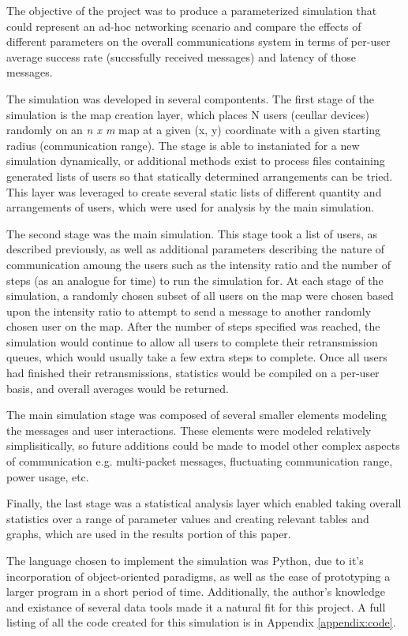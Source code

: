 The objective of the project was to produce a parameterized simulation 
that could represent an ad-hoc networking scenario and compare the effects 
of different parameters on the overall communications system in terms of 
per-user average success rate (succssfully received messages) 
and latency of those messages.

The simulation was developed in several compontents.
The first stage of the simulation is the map creation layer,
which places N users (ceullar devices) randomly on an \textit{n x m} map at a
given (x, y) coordinate with a given starting radius (communication range).
The stage is able to instaniated for a new simulation dynamically, or additional
methods exist to process files containing generated lists of users so that
statically determined arrangements can be tried.
This layer was leveraged to create several static lists of different quantity
and arrangements of users, which were used for analysis by the main simulation.

The second stage was the main simulation.
This stage took a list of users, as described previously, as well as additional
parameters describing the nature of communication amoung the users such as
the intensity ratio and the number of steps (as an analogue for time) to run 
the simulation for.
At each stage of the simulation, a randomly chosen subset of all users on the map
were chosen based upon the intensity ratio to attempt to send a message to another
randomly chosen user on the map.
After the number of steps specified was reached, the simulation would continue
to allow all users to complete their retransmission queues, which would usually
take a few extra steps to complete.
Once all users had finished their retransmissions, statistics would be compiled
on a per-user basis, and overall averages would be returned.

The main simulation stage was composed of several smaller elements modeling
the messages and user interactions.
These elements were modeled relatively simplisitically, so future additions could be
made to model other complex aspects of communication e.g. multi-packet messages,
fluctuating communication range, power usage, etc.

Finally, the last stage was a statistical analysis layer which enabled taking overall
statistics over a range of parameter values and creating relevant tables and graphs,
which are used in the results portion of this paper.

The language chosen to implement the simulation was Python, due to it's incorporation of 
object-oriented paradigms, as well as the ease of prototyping a larger program in a 
short period of time.
Additionally, the author's knowledge and existance of several data tools made it a natural
fit for this project.
A full listing of all the code created for this simulation is in Appendix \ref{appendix:code}.
